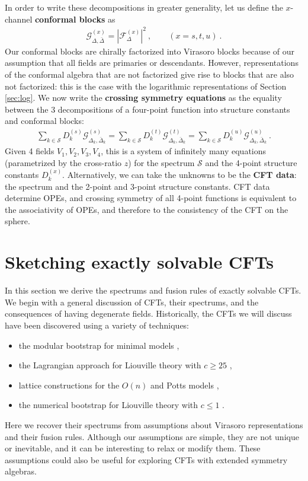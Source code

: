 \documentclass[12pt, a4paper]{article}
\theoremstyle{break}
\begin{document}
In order to write these decompositions in greater generality, let us define the $x$-channel \textbf{conformal blocks} as 
\begin{align}
 \mathcal{G}^{(x)}_{\Delta,\bar\Delta} = \left|\mathcal{F}_{\Delta}^{(x)}\right|^2\ , \qquad (x=s,t,u)\ . 
 \label{gf2}
\end{align}
Our conformal blocks are chirally factorized into Virasoro blocks because of our assumption that all fields are primaries or descendants. However, representations of the conformal algebra that are not factorized give rise to blocks that are also not factorized: this is the case with the logarithmic representations of Section \ref{sec:log}. We now write the \textbf{crossing symmetry equations} as the equality between the 3 decompositions of a four-point function into structure constants and conformal blocks:
\begin{align}
 \boxed{\sum_{k\in\mathcal{S}} D_k^{(s)} \mathcal{G}^{(s)}_{\Delta_k,\bar\Delta_k} = \sum_{k\in\mathcal{S}} D_k^{(t)} \mathcal{G}^{(t)}_{\Delta_k,\bar\Delta_k} = \sum_{k\in\mathcal{S}} D_k^{(u)} \mathcal{G}^{(u)}_{\Delta_k,\bar\Delta_k}} \ . 
 \label{seteu}
\end{align}
Given 4 fields $V_1,V_2,V_3,V_4$, this is a system of infinitely many equations (parametrized by the cross-ratio $z$) for the spectrum $\mathcal{S}$ and the 4-point structure constants $D_k^{(x)}$. Alternatively, we can take the unknowns to be the \textbf{CFT data}: the spectrum and the 2-point and 3-point structure constants. CFT data determine OPEs, and crossing symmetry of all 4-point functions is equivalent to the associativity of OPEs, and therefore to the consistency of the CFT on the sphere. 


\section{Sketching exactly solvable CFTs}\label{sec:sesc}

In this section we derive the spectrums and fusion rules of exactly solvable CFTs. We begin with a general discussion of CFTs, their spectrums, and the consequences of having degenerate fields. Historically, the CFTs we will discuss have been discovered using a variety of techniques: 
\begin{itemize}
 \item the modular bootstrap for minimal models \cite{fms97},
 \item the Lagrangian approach for Liouville theory with $c\geq 25$ \cite{zz95},
 \item lattice constructions for the $O(n)$ and Potts models \cite{fsz87},
 \item the numerical bootstrap for Liouville theory with $c\leq 1$ \cite{rs15}.
\end{itemize}
Here we recover their spectrums from assumptions about Virasoro representations and their fusion rules. Although our assumptions are simple, they are not unique or inevitable, and it can be interesting to relax or modify them. These assumptions could also be useful for exploring CFTs with extended symmetry algebras. 
\end{document}
